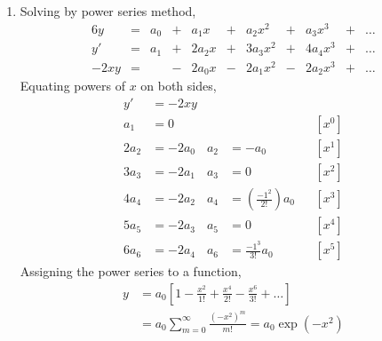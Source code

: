 \begin{enumerate}
    \item Solving by power series method,
          \begin{alignat}{6}
              y     & ={}      & a_0   & {}+{}    & a_1 x  &
              {}+{} & a_2 x^2  & {}+{} & a_3x^3   & {}+{}  & \dots \\
              y'    & ={}      & a_1   & {}+{}    & 2a_2 x &
              {}+{} & 3a_3 x^2 & {}+{} & 4a_4 x^3 & {}+{}  & \dots \\
              -2xy  & ={}      &       & {}-{}    & 2a_0 x &
              {}-{} & 2a_1 x^2 & {}-{} & 2a_2 x^3 & {}+{}  & \dots
          \end{alignat}
          Equating powers of $ x $ on both sides, \\
          \begin{align}
              y'   & = -2xy                                           \\
              a_1  & = 0                                  &
                   &                                      &   & [x^0] \\
              2a_2 & = -2a_0                              &
              a_2  & = -a_0                               &   & [x^1] \\
              3a_3 & = -2a_1                              &
              a_3  & = 0                                  &   & [x^2] \\
              4a_4 & = -2a_2                              &
              a_4  & = \left( \frac{-1^2}{2!} \right) a_0 &   & [x^3] \\
              5a_5 & = -2a_3                              &
              a_5  & = 0                                  &   & [x^4] \\
              6a_6 & = -2a_4                              &
              a_6  & = \frac{-1^3}{3!}a_0                 &   & [x^5]
          \end{align}
          Assigning the power series to a function,
          \begin{align}
              y & = a_0 \left[1 - \frac{x^2}{1!} + \frac{x^4}{2!}
              - \frac{x^6}{3!} + \dots \right]                    \\
                & = a_0 \sum_{m = 0}^{\infty}
              \frac{\left( -x^2 \right)^m}{m!} = a_0\exp(-x^2)
          \end{align}


\end{enumerate}
